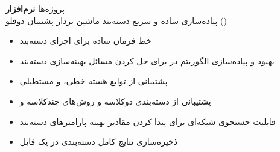 \documentclass{resume} %
\begin{document}
\begin{rSection}{پروژه‌ها}
	{\textbf{نرم‌افزار } } \hfill {} \\ 
	پیاده‌سازی ساده و سریع دسته‌بند ماشین بردار پشتیبان دوقلو ()
{\footnotesize
	\begin{itemize}
		\item خط فرمان ساده برای اجرای دسته‌بند 
		\item بهبود و پیاده‌سازی الگوریتم  در  برای حل کردن مسائل بهینه‌سازی دسته‌بند 
		\item پشتیبانی از توابع هسته خطی،  و مستطیلی
		\item پشتیبانی از دسته‌بندی دوکلاسه و روش‌های چندکلاسه  و 
		\item قابلیت جستجوی شبکه‌ای برای پیدا کردن مقادیر بهینه پارامترهای دسته‌بند
        \item ذخیره‌سازی نتایج کامل دسته‌بندی در یک فایل 	
	\end{itemize}
}
	
\end{rSection}

\end{document}
